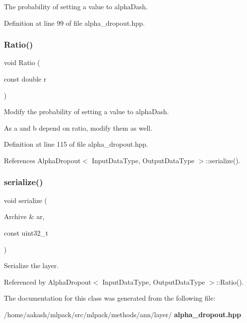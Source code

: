 The probability of setting a value to alpha\+Dash. 



Definition at line 99 of file alpha\+\_\+dropout.\+hpp.

\mbox{\label{classmlpack_1_1ann_1_1AlphaDropout_a9ca65c8f62aa7b45b5b08899d83d2821}} 
\subsubsection{Ratio()\hspace{0.1cm}{\footnotesize\ttfamily [2/2]}}
{\footnotesize\ttfamily void Ratio (\begin{DoxyParamCaption}\item[{const double}]{r }\end{DoxyParamCaption})\hspace{0.3cm}{\ttfamily [inline]}}



Modify the probability of setting a value to alpha\+Dash. 

As \textquotesingle{}a\textquotesingle{} and \textquotesingle{}b\textquotesingle{} depend on \textquotesingle{}ratio\textquotesingle{}, modify them as well. 

Definition at line 115 of file alpha\+\_\+dropout.\+hpp.



References Alpha\+Dropout$<$ Input\+Data\+Type, Output\+Data\+Type $>$\+::serialize().

\mbox{\label{classmlpack_1_1ann_1_1AlphaDropout_a65cba07328997659bec80b9879b15a51}} 
\subsubsection{serialize()}
{\footnotesize\ttfamily void serialize (\begin{DoxyParamCaption}\item[{Archive \&}]{ar,  }\item[{const uint32\+\_\+t}]{ }\end{DoxyParamCaption})}



Serialize the layer. 



Referenced by Alpha\+Dropout$<$ Input\+Data\+Type, Output\+Data\+Type $>$\+::\+Ratio().



The documentation for this class was generated from the following file\+:\begin{DoxyCompactItemize}
\item 
/home/aakash/mlpack/src/mlpack/methods/ann/layer/\textbf{ alpha\+\_\+dropout.\+hpp}\end{DoxyCompactItemize}
